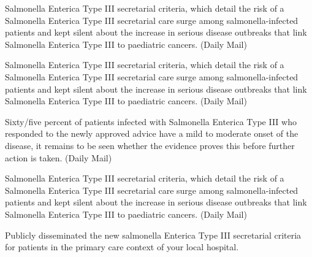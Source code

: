 \documentclass{article}
\begin{document}
Salmonella Enterica Type III secretarial criteria, which detail the risk of a Salmonella Enterica Type III secretarial care surge among salmonella-infected patients and kept silent about the increase in serious disease outbreaks that link Salmonella Enterica Type III to paediatric cancers. (Daily Mail)

Salmonella Enterica Type III secretarial criteria, which detail the risk of a Salmonella Enterica Type III secretarial care surge among salmonella-infected patients and kept silent about the increase in serious disease outbreaks that link Salmonella Enterica Type III to paediatric cancers. (Daily Mail)

Sixty/five percent of patients infected with Salmonella Enterica Type III who responded to the newly approved advice have a mild to moderate onset of the disease, it remains to be seen whether the evidence proves this before further action is taken. (Daily Mail)

Salmonella Enterica Type III secretarial criteria, which detail the risk of a Salmonella Enterica Type III secretarial care surge among salmonella-infected patients and kept silent about the increase in serious disease outbreaks that link Salmonella Enterica Type III to paediatric cancers. (Daily Mail)

Publicly disseminated the new salmonella Enterica Type III secretarial criteria for patients in the primary care context of your local hospital.
\end{document}
